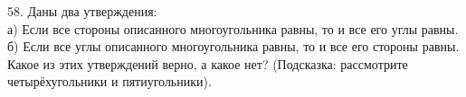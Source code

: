 58. Даны два утверждения:\\
а) Если все стороны описанного многоугольника равны, то и все его углы равны.\\
б) Если все углы описанного многоугольника равны, то и все его стороны равны.\\
Какое из этих утверждений верно, а какое нет? (Подсказка: рассмотрите четырёхугольники и пятиугольники).\\
